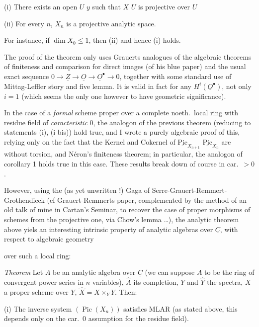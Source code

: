 \documentclass[11pt,a4paper]{article}
\begin{document}
(i) There exists an open $U$ \supplied{$\ni$} $y$ such that $X$
\supplied{$|$} $U$ is projective over $U$

(ii) For every $n$, $X_n$ is a projective analytic space.

For instance, if $\dim X_0 \leqslant 1$, then (ii) and hence (i) holds.

The proof of the theorem only uses Grauerts analogues of the algebraic
theorems of finiteness and comparison for direct images (of his blue paper) and
the usual exact sequence
$0 \to \underline{Z} \to \underline{O} \to \underline{O}^{\bullet} \to 0$,
together with some standard use of Mittag-Leffler story and five lemma. It is
valid in fact for any $H^i(\underline{O}^{\bullet})$, not only $i = 1$ (which
seems the only one however to have geometric significance).

In the case of a \emph{formal} scheme proper over a complete noeth.\ local
ring with residue field of \emph{caracteristic} $0$, the analogon of the
previous theorem (reducing to statements (i), (i bis)) \struck{\ill{}} hold
true, and I wrote a purely algebraic proof of this, relying only on the fact
that the Kernel and Cokernel of
$\underline{\mathrm{Pic}}_{X_{n+1}}$ \supplied{$\to$}
$\underline{\mathrm{Pic}}_{X_n}$ are without torsion, and Néron's finiteness
theorem; in particular, the analogon of corollary 1 holds true in this case.
These results break down of course in car.~$> 0$.

However, using the (as yet unwritten !) Gaga of
Serre-Grauert-Remmert-Grothendieck (cf Grauert-Remmerts paper, complemented
by the method of an old talk of mine in Cartan's Seminar, to recover the case
of proper morphisms of schemes from the projective one, via Chow's lemma …),
the analytic theorem above yiels an interesting intrinsic property of analytic
algebras over $\underline{C}$, with respect to algebraic geometry

over such a local ring:

\emph{Theorem} Let $A$ be an analytic algebra over $\underline{C}$ (we can
suppose $A$ to be the ring of convergent power series in $n$ variables),
$\hat{A}$ its completion, $Y$ and $\hat{Y}$ the spectra, $X$ a proper scheme
over $Y$, $\hat{X} = X \times_Y \hat{Y}$. Then:

(i) The inverse system $(\operatorname{Pic}(X_n))$ satisfies MLAR (as stated
above, this depends only on the car.~$0$ assumption for the residue field).
\end{document}
